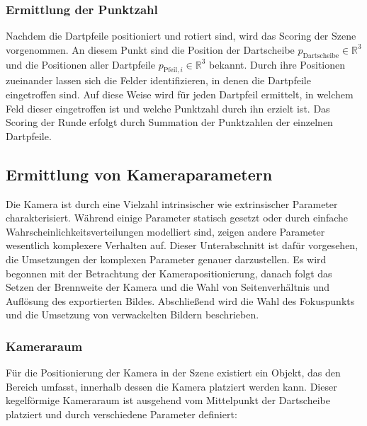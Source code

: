 \subsubsection{Ermittlung der Punktzahl}
\label{sec:dartpfeile_punktzahl}

Nachdem die Dartpfeile positioniert und rotiert sind, wird das Scoring der Szene vorgenommen. An diesem Punkt sind die Position der Dartscheibe $p_\text{Dartscheibe} \in \mathbb{R}^3$ und die Positionen aller Dartpfeile $p_{\text{Pfeil}, i} \in \mathbb{R}^3$ bekannt. Durch ihre Positionen zueinander lassen sich die Felder identifizieren, in denen die Dartpfeile eingetroffen sind. Auf diese Weise wird für jeden Dartpfeil ermittelt, in welchem Feld dieser eingetroffen ist und welche Punktzahl durch ihn erzielt ist. Das Scoring der Runde erfolgt durch Summation der Punktzahlen der einzelnen Dartpfeile.

\subsection{Ermittlung von Kameraparametern}  %
\label{sec:ermittlung_kameraparamater}

Die Kamera ist durch eine Vielzahl intrinsischer wie extrinsischer Parameter charakterisiert. Während einige Parameter statisch gesetzt oder durch einfache Wahrscheinlichkeitsverteilungen modelliert sind, zeigen andere Parameter wesentlich komplexere Verhalten auf. Dieser Unterabschnitt ist dafür vorgesehen, die Umsetzungen der komplexen Parameter genauer darzustellen. Es wird begonnen mit der Betrachtung der Kamerapositionierung, danach folgt das Setzen der Brennweite der Kamera und die Wahl von Seitenverhältnis und Auflösung des exportierten Bildes. Abschließend wird die Wahl des Fokuspunkts und die Umsetzung von verwackelten Bildern beschrieben.

\subsubsection{Kameraraum}
\label{sec:kameraraum}

Für die Positionierung der Kamera in der Szene existiert ein Objekt, das den Bereich umfasst, innerhalb dessen die Kamera platziert werden kann. Dieser kegelförmige Kameraraum ist ausgehend vom Mittelpunkt der Dartscheibe platziert und durch verschiedene Parameter definiert:

